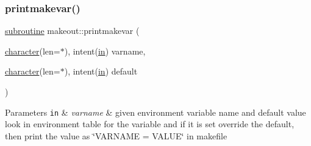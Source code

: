 \subsubsection{\texorpdfstring{printmakevar()}{printmakevar()}}
{\footnotesize\ttfamily \hyperlink{M__stopwatch_83_8txt_acfbcff50169d691ff02d4a123ed70482}{subroutine} makeout\+::printmakevar (\begin{DoxyParamCaption}\item[{\hyperlink{option__stopwatch_83_8txt_abd4b21fbbd175834027b5224bfe97e66}{character}(len=$\ast$), intent(\hyperlink{M__journal_83_8txt_afce72651d1eed785a2132bee863b2f38}{in})}]{varname,  }\item[{\hyperlink{option__stopwatch_83_8txt_abd4b21fbbd175834027b5224bfe97e66}{character}(len=$\ast$), intent(\hyperlink{M__journal_83_8txt_afce72651d1eed785a2132bee863b2f38}{in})}]{default }\end{DoxyParamCaption})}


\begin{DoxyParams}[1]{Parameters}
\mbox{\tt in}  & {\em varname} & given environment variable name and default value look in environment table for the variable and if it is set override the default, then print the value as \char`\"{}\+V\+A\+R\+N\+A\+M\+E = V\+A\+L\+U\+E\char`\"{} in makefile \\
\hline
\end{DoxyParams}
